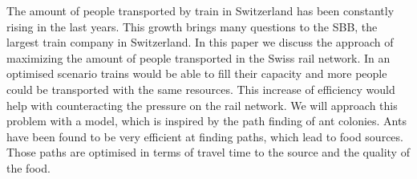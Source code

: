 The amount of people transported by train in Switzerland has been constantly rising in the last years. This growth brings many questions to the SBB, the largest train company in Switzerland. \citep{SbbStats} In this paper we discuss the approach of maximizing the amount of people transported in the Swiss rail network. In an optimised scenario trains would be able to fill their capacity and more people could be transported with the same resources. This increase of efficiency would help with counteracting the pressure on the rail network. 
We will approach this problem with a model, which is inspired by the path finding of ant colonies. Ants have been found to be very efficient at finding paths, which lead to food sources. Those paths are optimised in terms of travel time to the source and the quality of the food.